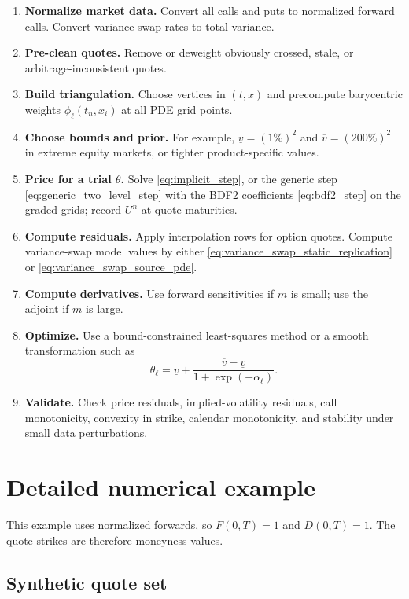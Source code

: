 \documentclass[11pt]{article}
\newcommand{\1}{\mathbf{1}}
\begin{document}
\begin{enumerate}[label=\arabic*.,leftmargin=0.9cm]
\item \textbf{Normalize market data.}
      Convert all calls and puts to normalized forward calls. Convert variance-swap
      rates to total variance.
\item \textbf{Pre-clean quotes.}
      Remove or deweight obviously crossed, stale, or arbitrage-inconsistent quotes.
\item \textbf{Build triangulation.}
      Choose vertices in $(t,x)$ and precompute barycentric weights
      $\phi_\ell(t_n,x_i)$ at all PDE grid points.
\item \textbf{Choose bounds and prior.}
      For example, $\underline v=(1\%)^2$ and $\overline v=(200\%)^2$ in extreme equity
      markets, or tighter product-specific values.
\item \textbf{Price for a trial $\theta$.}
      Solve \eqref{eq:implicit_step}, or the generic step \eqref{eq:generic_two_level_step}
      with the BDF2 coefficients \eqref{eq:bdf2_step} on the graded grids; record $U^n$
      at quote maturities.
\item \textbf{Compute residuals.}
      Apply interpolation rows for option quotes. Compute variance-swap model values by
      either \eqref{eq:variance_swap_static_replication} or
      \eqref{eq:variance_swap_source_pde}.
\item \textbf{Compute derivatives.}
      Use forward sensitivities if $m$ is small; use the adjoint if $m$ is large.
\item \textbf{Optimize.}
      Use a bound-constrained least-squares method or a smooth transformation such as
      \[
        \theta_\ell
        =
        \underline v+
        \frac{\overline v-\underline v}{1+\exp(-\alpha_\ell)}.
      \]
\item \textbf{Validate.}
      Check price residuals, implied-volatility residuals, call monotonicity,
      convexity in strike, calendar monotonicity, and stability under small data
      perturbations.
\end{enumerate}

\section{Detailed numerical example}

This example uses normalized forwards, so $F(0,T)=1$ and $D(0,T)=1$. The quote strikes
are therefore moneyness values.

\subsection{Synthetic quote set}
\end{document}
